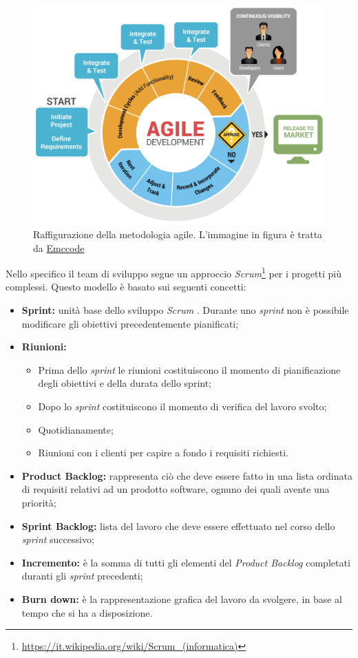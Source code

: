 \begin{figure}[h]
\centering
\includegraphics[width=0.6\linewidth]{immagini/agile}
\caption[Raffigurazione della metodologia agile]{Raffigurazione della metodologia agile. L'immagine in figura è tratta da \href{https://github.com/emccode/training}{Emccode}}
\label{fig:agile}
\end{figure}
\newpage
Nello specifico il team di sviluppo segue un approccio \textit{Scrum}\footnote{\url{https://it.wikipedia.org/wiki/Scrum_(informatica)}} per i progetti più complessi. Questo modello è basato sui seguenti concetti:
\begin{itemize}
	\item \textbf{Sprint: }unità base dello sviluppo \textit{Scrum }. Durante uno \textit{sprint }non è possibile modificare gli obiettivi precedentemente pianificati;
	\item\textbf{Riunioni: }
	\begin{itemize}
		\item Prima dello \textit{sprint } le riunioni costituiscono il momento di pianificazione degli obiettivi e della durata dello sprint;
		\item Dopo lo \textit{sprint} costituiscono il momento di verifica del lavoro svolto;
		\item Quotidianamente;
		\item Riunioni con i clienti per capire a fondo i requisiti richiesti.
	\end{itemize}
	\item \textbf{Product Backlog: }rappresenta ciò che deve essere fatto in una lista ordinata di requisiti relativi ad un prodotto software, ognuno dei quali avente una priorità;
	\item \textbf{Sprint Backlog: }lista del lavoro che deve essere effettuato nel corso dello \textit{sprint }successivo;
	\item \textbf{Incremento: }è la somma di tutti gli elementi del \textit{Product Backlog }completati duranti gli \textit{sprint} precedenti;
	\item \textbf{Burn down: }è la rappresentazione grafica del lavoro da svolgere, in base al tempo che si ha a disposizione.
\end{itemize}

